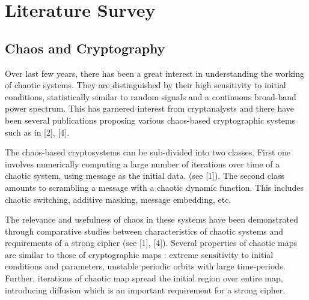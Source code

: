 \chapter{Literature Survey}
\label{chap:lit}
\setlength{\parskip}{1.5mm}
\section{Chaos and Cryptography}
Over last few years, there has been a great interest in understanding the working of chaotic systems. They are distinguished by their high sensitivity to initial conditions, statistically similar to random signals and a continuous broad-band power spectrum. This has garnered interest from cryptanalysts and there have been several publications proposing various chaos-based cryptographic systems such as in [2], [4].

The chaos-based cryptosystems can be sub-divided into two classes. First one involves numerically computing a large number of iterations over time of a chaotic system, using message as the initial data. (see [1]). The second class amounts to scrambling a message with a chaotic dynamic function. This includes chaotic switching, additive masking, message embedding, etc.

The relevance and usefulness of chaos in these systems have been demonstrated through comparative studies between characteristics of chaotic systems and requirements of a strong cipher (see [1], [4]). Several properties of chaotic maps are similar to those of cryptographic maps : extreme sensitivity to initial conditions and parameters, unstable periodic orbits with large time-periods. Further, iterations of chaotic map spread the initial region over entire map, introducing diffusion which is an important requirement for a strong cipher.

